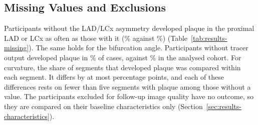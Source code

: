 \subsection{Missing Values and Exclusions}
\label{sec:results-missing}

Participants without the LAD/LCx asymmetry developed plaque in the proximal LAD or LCx as often as those with it (\% against \%) (Table~\ref{tab:results-missing}).
The same holds for the bifurcation angle.
Participants without tracer output developed plaque in \% of cases, against \% in the analysed cohort.
For curvature, the share of segments that developed plaque was compared within each segment.
It differs by at most  percentage points, and each of these differences rests on fewer than five segments with plaque among those without a value.
The participants excluded for follow-up image quality have no outcome, so they are compared on their baseline characteristics only (Section~\ref{sec:results-characteristics}).

